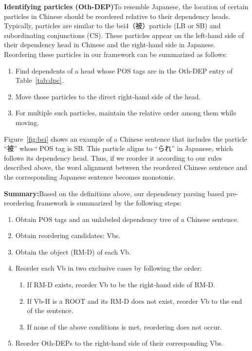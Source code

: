 \documentclass[english]{jnlp_1.4}
\begin{document}
{\bf Identifying particles (Oth-DEP)}\quad To resemble Japanese, the location 
of certain particles in Chinese should be reordered relative to their dependency 
heads. Typically, particles are similar to the bei4（被）particle (LB or SB) and subordinating 
conjunctions (CS). These particles appear on the left-hand side of their dependency 
head in Chinese and the right-hand side in Japanese. Reordering these particles 
in our framework can be summarized as follows:

\begin{enumerate}
\item Find dependents of a head whose POS tags are in the Oth-DEP entry of Table~\ref{tab:dpc}.
\item Move those particles to the direct right-hand side of the head.
\item For multiple such particles, maintain the relative order among them while moving.
\end{enumerate}

Figure~\ref{fig:bei} shows an example of a Chinese sentence that includes the particle
``被'' whose POS tag is SB. This particle aligns to ``られ'' in Japanese, which follows 
its dependency head. Thus, if we reorder it according to our rules described above,
the word alignment between the reordered Chinese sentence and
the corresponding Japanese sentence becomes monotonic.

{\bf Summary:}\quad Based on the definitions above, our dependency parsing based 
pre-reordering framework is summarized by the following steps:

\begin{enumerate}
\item Obtain POS tags and an unlabeled dependency tree of a Chinese sentence.
\item Obtain reordering candidates: Vbs.
\item Obtain the object (RM-D) of each Vb.
\item Reorder each Vb in two exclusive cases by following the order:
\begin{enumerate}
\item If RM-D exists, reorder Vb to be the right-hand side of RM-D.
\item If Vb-H is a ROOT and its RM-D does not exist, reorder Vb to the end of the sentence.
\item If none of the above conditions is met, reordering does not occur. 
\end{enumerate}
\item Reorder Oth-DEPs to the right-hand side of their corresponding Vbs.
\end{enumerate}
\end{document}
